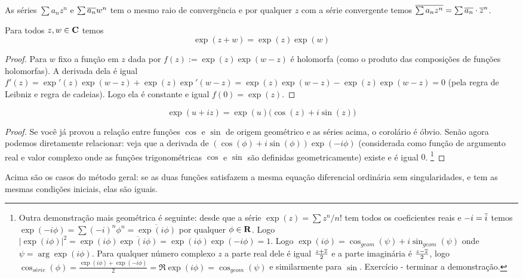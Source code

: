 As séries $\sum a_n z^n$ e $\sum \overline{a_n} w^n$ tem o mesmo raio de convergência e por qualquer $z$ com a série convergente temos
$\overline{\sum a_n z^n} = \sum \overline{a_n} \cdot \overline{z}^n$.

\begin{prop}
Para todos $z,w\in \mathbf{C}$ temos
\begin{equation}
\exp(z+w) = \exp(z) \exp(w)
\end{equation}
\end{prop}
\begin{proof}
Para $w$ fixo a função em $z$ dada por
$f(z) := \exp(z) \exp(w-z)$ é holomorfa (como o produto das composições de funções holomorfas).
A derivada dela é igual $f'(z) = \exp'(z) \exp(w-z) + \exp(z) \exp'(w-z) = \exp(z) \exp(w-z) - \exp(z) \exp(w-z) = 0$
(pela regra de Leibniz e regra de cadeias). Logo ela é constante e igual $f(0) = \exp(z)$.
\end{proof}

\begin{cor}
\begin{equation}
\exp(u+iz) = \exp(u) \big( \cos(z) + i \sin(z) \big)
\end{equation}
\end{cor}
\begin{proof}
Se você já provou a relação entre funções $\cos$ e $\sin$ de origem geométrico e as séries acima,
o corolário é óbvio. Senão agora podemos diretamente relacionar: veja que a derivada de
$(\cos(\phi) + i \sin(\phi)) \exp(-i\phi)$ (considerada como função de argumento real e valor complexo
onde as funções trigonométricas $\cos$ e $\sin$ são definidas geometricamente)
existe e é igual $0$.
\footnote{
Outra demonstração mais geométrica é seguinte:
desde que a série $\exp(z) = \sum z^n / n!$ tem todos os coeficientes reais e $-i = \overline{i}$ temos
$\exp(-i\phi) = \sum (-i)^n \phi^n = \overline{\exp(i\phi)}$ por qualquer $\phi \in \mathbf{R}$.
Logo $|\exp(i\phi)|^2 = \exp(i\phi) \overline{\exp(i\phi)} = \exp(i\phi) \exp(-i\phi) = 1$.
Logo $\exp(i\phi) = \cos_{geom}(\psi) + i \sin_{geom}(\psi)$ onde $\psi = \arg \exp(i\phi)$.
Para qualquer número complexo $z$ a parte real dele é igual $\frac{z+\overline{z}}2$
e a parte imaginária é $\frac{z-\overline{z}}2$, logo $\cos_{série}(\phi) = \frac{\exp(i\phi)+\exp(-i\phi)}2 = \Re \exp(i\phi) = \cos_{geom}(\psi)$ e similarmente para $\sin$.
Exercício - terminar a demonstração.
}
\end{proof}

\begin{remark}
Acima são os casos do método geral:
se as duas funções satisfazem a mesma equação diferencial ordinária sem singularidades,
e tem as mesmas condições iniciais, elas são iguais.
\end{remark}

